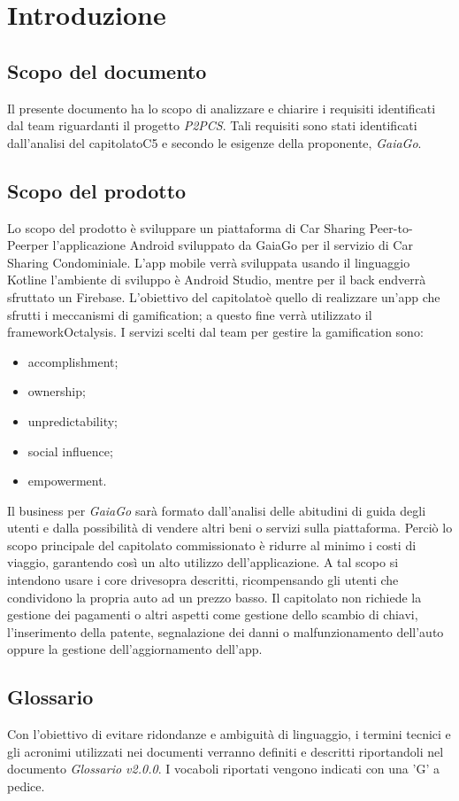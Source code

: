 \section{Introduzione} 
\subsection{Scopo del documento}
Il presente documento ha lo scopo di analizzare e chiarire i requisiti identificati dal team riguardanti il progetto \textit{P2PCS}. Tali requisiti sono stati identificati dall'analisi del capitolato\glosp C5 e secondo le esigenze della proponente, \textit{GaiaGo}.
\subsection{Scopo del prodotto}
Lo scopo del prodotto è sviluppare un piattaforma di Car Sharing Peer-to-Peer\glosp  per l'applicazione Android sviluppato da GaiaGo per il servizio di Car Sharing Condominiale. L'app mobile verrà sviluppata usando il linguaggio Kotlin\glosp e l'ambiente di sviluppo è Android Studio, mentre per il back end\glosp verrà sfruttato un Firebase\glo. L'obiettivo del capitolato\glosp è quello di realizzare un'app che sfrutti i meccanismi di gamification\glo; a questo fine verrà utilizzato il framework\glosp Octalysis\glo. I servizi scelti dal team per gestire la gamification sono:
\begin{itemize}
	\item {accomplishment};
	\item {ownership};
	\item {unpredictability};
	\item {social influence};
	\item {empowerment}.
\end{itemize}
Il business per \textit{GaiaGo} sarà formato dall'analisi delle abitudini di guida degli utenti e dalla possibilità di vendere altri beni o servizi sulla piattaforma. Perciò lo scopo principale del capitolato commissionato è ridurre al minimo i costi di viaggio, garantendo così un alto utilizzo dell'applicazione. 
A tal scopo si intendono usare i core drive\glosp sopra descritti, ricompensando gli utenti che condividono la propria auto ad un prezzo basso. Il capitolato non richiede la gestione dei pagamenti o altri aspetti come gestione dello scambio di chiavi, l'inserimento della patente, segnalazione dei danni o malfunzionamento dell'auto oppure la gestione dell'aggiornamento dell'app.

\subsection{Glossario}
Con l’obiettivo di evitare ridondanze e ambiguità di linguaggio, i termini tecnici e gli acronimi utilizzati nei documenti verranno definiti e descritti riportandoli nel documento \textit{Glossario v2.0.0}.  I vocaboli riportati vengono indicati con una 'G' a pedice.
